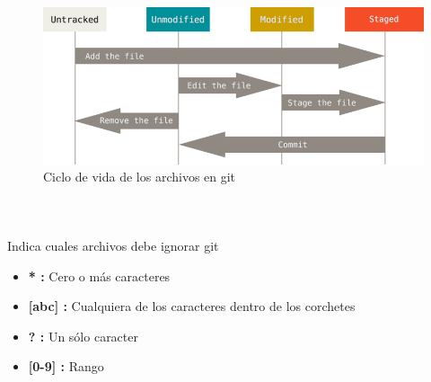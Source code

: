 \documentclass{beamer}
\newcommand\crule[3][black]{\textcolor{#1}{\rule{#2}{#3}}}
\begin{document}
\begin{frame}
  \begin{center}
    \resizebox{0.5\textwidth}{!}{\FiraTitle%
      \textcolor{black}{Ciclo de vida de un archivo}}
  \end{center}
  \begin{figure}
    \centering
    \includegraphics[width=\textwidth]{ciclo}
    \caption{Ciclo de vida de los archivos en git}
  \end{figure}
\end{frame}

\begin{frame}
  \begin{columns}
    \resizebox{\textwidth}{!}{\FiraTitle \textcolor{purple}{Add}}
    \vspace{1em}
    \crule[purple]{\textwidth}{3em}
  \end{columns}
\end{frame}

\begin{frame}
  \begin{center}
    \resizebox{\textwidth}{!}{\FiraTitle \color{green}{.gitignore}}
    \vspace{1em}
    
    {\FiraTitle Indica cuales archivos debe ignorar git}
    \vspace{1em}
  \end{center}
  {\FiraTitle \color{purple}{Glob patterns:}}
  \begin{itemize}
  \item \textbf{* :} Cero o más caracteres
  \item \textbf{[abc] :} Cualquiera de los caracteres dentro de los corchetes
  \item \textbf{? :} Un sólo caracter
  \item \textbf{[0-9] :} Rango
  \end{itemize}
\end{frame}
\end{document}
